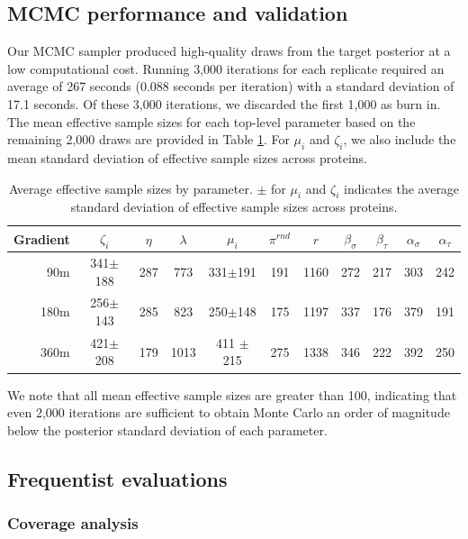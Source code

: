 \subsection{MCMC performance and validation}
\label{proteomics:sec:mcmc_performance}

Our MCMC sampler produced high-quality draws from the target posterior at a low computational cost.
Running 3,000 iterations for each replicate required an average of 267 seconds (0.088 seconds per iteration) with a standard deviation of 17.1 seconds.
Of these 3,000 iterations, we discarded the first 1,000 as burn in.
The mean effective sample sizes for each top-level parameter based on the remaining 2,000 draws are provided in Table \ref{proteomics:tab:effective_sample_sizes}.
For $\mu_i$ and $\zeta_i$, we also include the mean standard deviation of effective sample sizes across proteins.
%
\begin{table}
\centering
\caption{Average effective sample sizes by parameter. $\pm$ for $\mu_{i}$
and $\zeta_{i}$ indicates the average standard deviation of effective
sample sizes across proteins. \label{proteomics:tab:effective_sample_sizes}}
\begin{tabular}{r|cccccccccc}
\hline 
Gradient  & $\zeta_{i}$ & $\eta$  & $\lambda$ & $\mu_i$  & $\pi^{rnd}$ & $r$ & $\beta_{\sigma}$ & $\beta_{\tau}$ & $\alpha_{\sigma}$ & $\alpha_{\tau}$\tabularnewline
\hline 
90m  & 341$\pm$188  & 287  & 773  & 331$\pm$191 & 191  & 1160  & 272  & 217  & 303  & 242 \tabularnewline
180m  & 256$\pm$143 & 285  & 823  & 250$\pm$148 & 175  & 1197  & 337  & 176  & 379  & 191 \tabularnewline
360m  & 421$\pm$208 & 179  & 1013  & 411 $\pm$215 & 275  & 1338  & 346  & 222  & 392  & 250 \tabularnewline
\hline 
\end{tabular}
\end{table}
%
We note that all mean effective sample sizes are greater than 100, indicating that even 2,000 iterations are sufficient to obtain Monte Carlo  an order of magnitude below the posterior standard deviation of each parameter.

\subsection{Frequentist evaluations}
\label{proteomics:sec:frequentist_evaluations}

\subsubsection{Coverage analysis}
\label{proteomics:sec:coverage}

